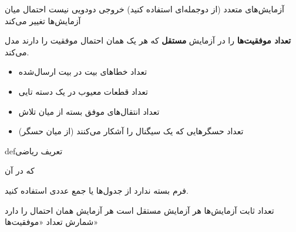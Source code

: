 
\lr{\mbox{\PSno{}}} آزمایش‌های متعدد (از دوجمله‌ای استفاده کنید)\PSbr{}\lr{\mbox{\PSno{}}} خروجی دودویی نیست\PSbr{}\lr{\mbox{\PSno{}}} احتمال میان آزمایش‌ها تغییر می‌کند



\textbf{تعداد موفقیت‌ها} را در  آزمایش \textbf{مستقل} که هر یک همان احتمال موفقیت  را دارند مدل می‌کند.


\begin{itemize}
\tightlist
\item
  تعداد خطاهای بیت در  بیت ارسال‌شده
\item
  تعداد قطعات معیوب در یک دسته ‌تایی
\item
  تعداد انتقال‌های موفق بسته از میان  تلاش
\item
  تعداد حسگرهایی که یک سیگنال را آشکار می‌کنند (از میان  حسگر)
\end{itemize}

\begin{PSbox}[unbreakable]{def}{تعریف ریاضی}


\end{PSbox}



که در آن 



فرم بسته ندارد  از جدول‌ها یا جمع عددی استفاده کنید.






\lr{\mbox{\PSyes{}}} تعداد ثابت آزمایش‌ها \PSbr{}\lr{\mbox{\PSyes{}}} هر آزمایش مستقل است\PSbr{}\lr{\mbox{\PSyes{}}} هر آزمایش همان احتمال  را دارد\PSbr{}\lr{\mbox{\PSyes{}}} شمارش تعداد «موفقیت‌ها»

